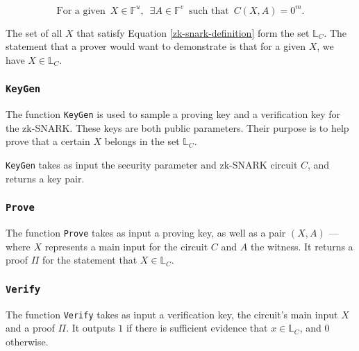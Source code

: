\documentclass{article}
\begin{document}
\begin{equation}
\text{For a given} \,\,\, X \in \mathbb{F}^u, \,\,\, \exists A \in \mathbb{F}^v \,\,\, \text{such that} \,\,\, C(X, A) = 0^{m}.
\label{zk-snark-definition}
\end{equation}
\newline

The set of all $X$ that satisfy Equation \ref{zk-snark-definition} form the set $\mathbb{L}_C$. The statement that a prover would want to demonstrate is that for a given $X$, we have $X \in \mathbb{L}_C$.

\subsubsection{\texttt{KeyGen}}
The function \texttt{KeyGen} is used to sample a proving key and a verification key for the zk-SNARK. These keys are both public parameters. Their purpose is to help prove that a certain $X$ belongs in the set $\mathbb{L}_C$.

\texttt{KeyGen} takes as input the security parameter and zk-SNARK circuit $C$, and returns a key pair.

\subsubsection{\texttt{Prove}}
The function \texttt{Prove} takes as input a proving key, as well as a pair $(X, A)$ --- where $X$ represents a main input for the circuit $C$ and $A$ the witness. It returns a proof $\Pi$ for the statement that $X \in \mathbb{L}_C$.

\subsubsection{\texttt{Verify}}
The function \texttt{Verify} takes as input a verification key, the circuit's main input $X$ and a proof $\Pi$. It outputs $1$ if there is sufficient evidence that $x \in \mathbb{L}_C$, and 0 otherwise.
\end{document}
